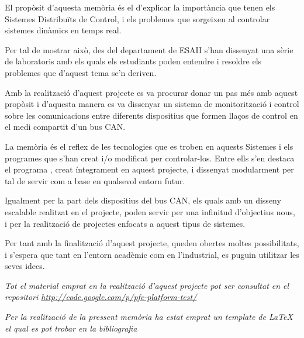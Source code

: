 


\begin{abstracts}        %

El propòsit d'aquesta memòria és el d'explicar la importància que tenen els Sistemes Distribuïts de Control, i els problemes que sorgeixen al controlar sistemes dinàmics en temps real.

Per tal de mostrar això, des del departament de ESAII s'han dissenyat una sèrie de laboratoris amb els quals els estudiants poden entendre i resoldre els problemes que d'aquest tema se'n deriven.

Amb la realització d'aquest projecte es va procurar donar un pas més amb aquest propòsit i d'aquesta manera es va dissenyar un sistema de monitorització i control sobre les comunicacions entre diferents dispositius que formen llaços de control en el medi compartit d'un bus CAN.

La memòria és el reflex de les tecnologies que es troben en aquests Sistemes i els programes que s'han creat i/o modificat per controlar-los. Entre ells s'en destaca el programa \DCSMonitor, creat íntegrament en aquest projecte, i dissenyat modularment per tal de servir com a base en qualsevol entorn futur.

Igualment per la part dels dispositius del bus CAN, els quals amb un disseny escalable realitzat en el projecte, poden servir per una infinitud d'objectius nous, i per la realització de projectes enfocats a aquest tipus de sistemes.

Per tant amb la finalització d'aquest projecte, queden obertes moltes possibilitats, i s'espera que tant en l'entorn acadèmic com en l'industrial, es puguin utilitzar les seves idees.

\emph{Tot el material emprat en la realització d'aquest projecte pot ser consultat en el repositori \href{http://code.google.com/p/pfc-platform-test/}{http://code.google.com/p/pfc-platform-test/}}

\emph{Per la realització de la pressent memòria ha estat emprat un template de LaTeX el qual es pot trobar en la bibliografia \cite{Korten2010}}

\end{abstracts}


